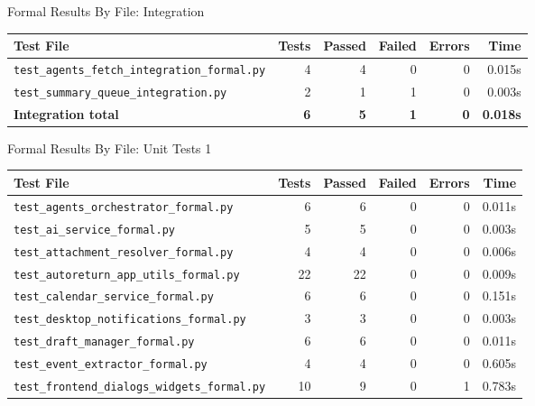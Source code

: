 \begin{frame}{Formal Results By File: Integration}
\scriptsize
\begin{tabular}{p{}rrrrr}
\hline
\textbf{Test File} & \textbf{Tests} & \textbf{Passed} & \textbf{Failed} & \textbf{Errors} & \textbf{Time}\\
\hline
\texttt{test\_agents\_fetch\_integration\_formal.py} & 4 & 4 & 0 & 0 & 0.015s\\
\texttt{test\_summary\_queue\_integration.py} & 2 & 1 & 1 & 0 & 0.003s\\
\hline
\textbf{Integration total} & \textbf{6} & \textbf{5} & \textbf{1} & \textbf{0} & \textbf{0.018s}\\
\hline
\end{tabular}
\end{frame}

\begin{frame}{Formal Results By File: Unit Tests 1}
\scriptsize
\begin{tabular}{p{}rrrrr}
\hline
\textbf{Test File} & \textbf{Tests} & \textbf{Passed} & \textbf{Failed} & \textbf{Errors} & \textbf{Time}\\
\hline
\texttt{test\_agents\_orchestrator\_formal.py} & 6 & 6 & 0 & 0 & 0.011s\\
\texttt{test\_ai\_service\_formal.py} & 5 & 5 & 0 & 0 & 0.003s\\
\texttt{test\_attachment\_resolver\_formal.py} & 4 & 4 & 0 & 0 & 0.006s\\
\texttt{test\_autoreturn\_app\_utils\_formal.py} & 22 & 22 & 0 & 0 & 0.009s\\
\texttt{test\_calendar\_service\_formal.py} & 6 & 6 & 0 & 0 & 0.151s\\
\texttt{test\_desktop\_notifications\_formal.py} & 3 & 3 & 0 & 0 & 0.003s\\
\texttt{test\_draft\_manager\_formal.py} & 6 & 6 & 0 & 0 & 0.011s\\
\texttt{test\_event\_extractor\_formal.py} & 4 & 4 & 0 & 0 & 0.605s\\
\texttt{test\_frontend\_dialogs\_widgets\_formal.py} & 10 & 9 & 0 & 1 & 0.783s\\
\hline
\end{tabular}
\end{frame}

